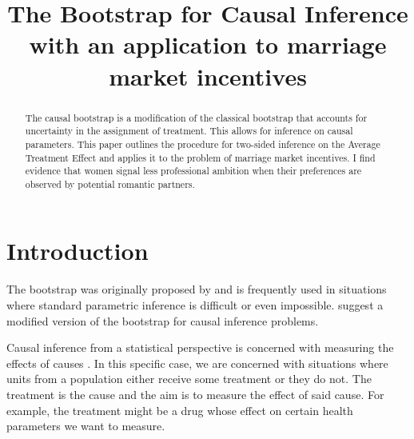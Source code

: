 \documentclass[aodsor,preprint]{imsart}
\numberwithin{equation}{section}
\theoremstyle{plain}
\begin{document}
\begin{frontmatter}
\title{The Bootstrap for Causal Inference with an application to marriage market incentives}

\begin{aug}
\author{ }





\end{aug}

\begin{abstract}
The causal bootstrap is a modification of the classical bootstrap that accounts for uncertainty in the assignment of treatment. This allows for inference on causal parameters. This paper outlines the procedure for two-sided inference on the Average Treatment Effect and applies it to the problem of marriage market incentives. I find evidence that women signal less professional ambition when their preferences are observed by potential romantic partners.
\end{abstract}

\begin{keyword}[class=MSC]
\end{keyword}

\begin{keyword}
\end{keyword}

\end{frontmatter}

\section{Introduction}

The bootstrap was originally proposed by \cite{Efron_1982} and is frequently used in situations where standard parametric inference is difficult or even impossible. \cite{Imbens_2021} suggest a modified version of the bootstrap for causal inference problems.

Causal inference from a statistical perspective is concerned with measuring the effects of causes \citep{Holland_1986}. In this specific case, we are concerned with situations where units from a population either receive some treatment or they do not. The treatment is the cause and the aim is to measure the effect of said cause. For example, the treatment might be a drug whose effect on certain health parameters we want to measure. 
\end{document}
